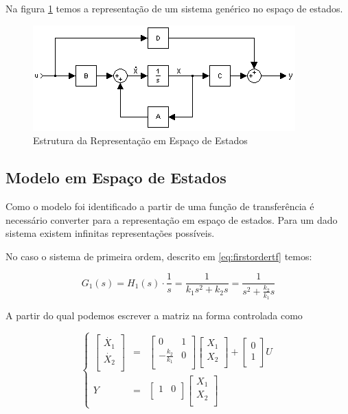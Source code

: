 \documentclass[a4paper,11pt]{article}
\begin{document}
Na figura \ref{fig:space_state_model} temos a representação de um sistema genérico no espaço de estados.

\begin{figure}[H]
    \centering
    \includegraphics{tex/img/space_state_model.png}
    \caption{Estrutura da Representação em Espaço de Estados}
    \label{fig:space_state_model}
\end{figure}

\subsection{Modelo em Espaço de Estados}
Como o modelo foi identificado a partir de uma função de transferência é necessário converter para a representação em espaço de estados. Para um dado sistema existem infinitas representações possíveis.

No caso o sistema de primeira ordem, descrito em \ref{eq:firstordertf} temos:

$$
G_1(s) = H_1(s)\cdot \frac{1}{s} = \frac{1}{k_1 s^2+ k_2 s} = \frac{1}{s^2+ \frac{k_2}{k_1} s}
$$

A partir do qual podemos escrever a matriz na forma controlada como

\begin{equation}
\left\{
\begin{array}{rcl}
\left[\begin{array}{c}
    \dot{X_1} \\
    \dot{X_2} \\
\end{array}
\right]
&
=
&
\left[
\begin{array}{cc}
    0 & 1 \\
    -\frac{k_2}{k_1} & 0 \\ 
\end{array}
\right]
\left[\begin{array}{c}
    X_1 \\
    X_2 \\
\end{array}
\right]
+
\left[\begin{array}{c}
    0 \\
    1 \\
\end{array}
\right]
U\\
Y & = &\left[
\begin{array}{cc}
    1 & 0 \\
\end{array}
\right]
\left[\begin{array}{c}
    X_1 \\
    X_2 \\
\end{array}
\right]
\end{array}
\right.
\end{equation}
\end{document}
